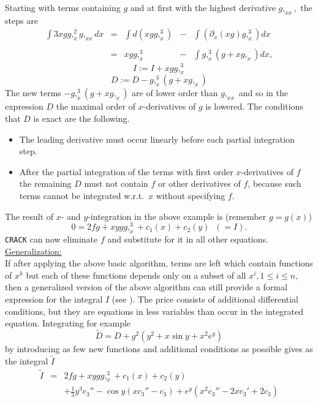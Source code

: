 Starting with terms containing $g$
and at first with the highest derivative $g,_{xx},$ the steps are
\[
\begin{array}{rcccl}
\int 3xgg,_x^2g,_{xx} dx
& = & \int d(xgg,_x^3)
    & - & \int \left( \partial_x(xg) g,_x^3\right) dx \\ \\
& = & xgg,_x^3 & - & \int g,_x^3(g + xg,_x) dx,
\end{array} \]
\[ I := I + xgg,_x^3 \]
\[ D := D - g,_x^3(g + xg,_x)  \]
The new terms $- g,_x^3(g + xg,_x)$ are of lower order than $g,_{xx}$
and so in the expression $D$ the maximal order of $x$-derivatives
of $g$ is lowered. The conditions that $D$ is exact are the following.
\begin{itemize}
\item The leading derivative must occur linearly before each partial
integration step.
\item After the partial integration of the terms with first order
$x$-derivatives of $f$ the remaining $D$ must not contain $f$
or other derivatives of $f$, because such terms cannot
be integrated w.r.t.\ $x$ without specifying $f$.
\end{itemize}
The result of $x$- and $y$-integration in the above example is
(remember $g=g(x)$)
\begin{equation}
0 = 2fg + xygg,_x^3 + c_1(x) + c_2(y) \; \; (=I). \nonumber
\end{equation}
{\tt CRACK} can now eliminate $f$ and substitute
for it in all other equations.
\underline{Generalization:} \\
If after applying the above basic algorithm, terms are left which contain
functions of $x^k$ but each of these functions depends only on a subset of
all $x^i, 1\leq i\leq n,$ then a generalized version of the above algorithm
can still provide a formal expression for the integral $I$
(see \cite{WoInt}). The price consists of
additional differential conditions, but they are equations in less variables
than occur in the integrated equation. Integrating for example
\begin{equation}
\tilde{D} = D + g^2(y^2 + x\sin y + x^2e^y)       \label{Dnew}
\end{equation}
by introducing as few
new functions and additional conditions as possible gives as the integral
$\tilde{I}$
\begin{eqnarray*}
\tilde{I} & = & 2fg + xygg,_{x}^{3} + c_1(x) + c_2(y) \\
  &   & + \frac{1}{3}y^3c_3'' - \cos y(xc_3'' - c_3)
+ e^y(x^2c_3'' - 2xc_3' + 2c_3)
\end{eqnarray*}
